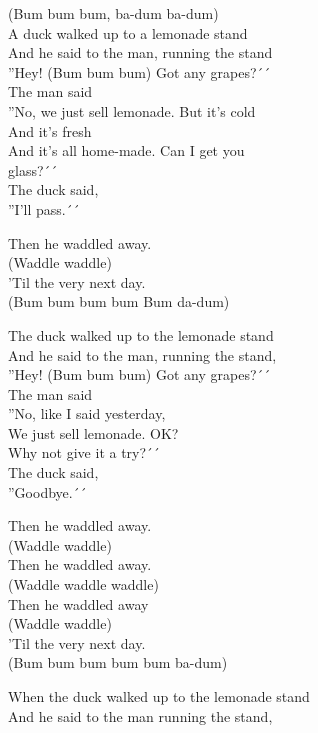 \vspace{10pt}
(Bum bum bum, ba-dum ba-dum)\\
A duck walked up to a lemonade stand\\
And he said to the man, running the stand\\
''Hey! (Bum bum bum) Got any grapes?´´\\
The man said\\
''No, we just sell lemonade. But it's cold\\
And it's fresh\\
And it's all home-made. Can I get you\\
glass?´´\\
The duck said,\\
''I'll pass.´´\par
\vspace{10pt}
Then he waddled away.\\
(Waddle waddle)\\
'Til the very next day.\\
(Bum bum bum bum Bum da-dum)\par
\vspace{10pt}
The duck walked up to the lemonade stand\\
And he said to the man, running the stand,\\
''Hey! (Bum bum bum) Got any grapes?´´\\
The man said\\
''No, like I said yesterday,\\
We just sell lemonade. OK?\\
Why not give it a try?´´\\
The duck said,\\
''Goodbye.´´\par
\vspace{10pt}
Then he waddled away.\\
(Waddle waddle)\\
Then he waddled away.\\
(Waddle waddle waddle)\\
Then he waddled away\\
(Waddle waddle)\\
'Til the very next day.\\
(Bum bum bum bum bum ba-dum)\par
\vspace{10pt}
When the duck walked up to the lemonade stand\\
And he said to the man running the stand,\\
